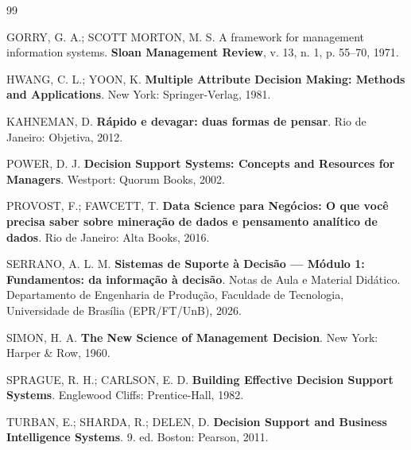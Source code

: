 \documentclass[12pt,a4paper]{article}
\begin{document}
\begin{thebibliography}{99}

GORRY, G. A.; SCOTT MORTON, M. S. A framework for management information systems. \textbf{Sloan Management Review}, v. 13, n. 1, p. 55--70, 1971.

HWANG, C. L.; YOON, K. \textbf{Multiple Attribute Decision Making: Methods and Applications}. New York: Springer-Verlag, 1981.

KAHNEMAN, D. \textbf{Rápido e devagar: duas formas de pensar}. Rio de Janeiro: Objetiva, 2012.

POWER, D. J. \textbf{Decision Support Systems: Concepts and Resources for Managers}. Westport: Quorum Books, 2002.

PROVOST, F.; FAWCETT, T. \textbf{Data Science para Negócios: O que você precisa saber sobre mineração de dados e pensamento analítico de dados}. Rio de Janeiro: Alta Books, 2016.

SERRANO, A. L. M. \textbf{Sistemas de Suporte à Decisão — Módulo 1: Fundamentos: da informação à decisão}. Notas de Aula e Material Didático. Departamento de Engenharia de Produção, Faculdade de Tecnologia, Universidade de Brasília (EPR/FT/UnB), 2026.

SIMON, H. A. \textbf{The New Science of Management Decision}. New York: Harper \& Row, 1960.

SPRAGUE, R. H.; CARLSON, E. D. \textbf{Building Effective Decision Support Systems}. Englewood Cliffs: Prentice-Hall, 1982.

TURBAN, E.; SHARDA, R.; DELEN, D. \textbf{Decision Support and Business Intelligence Systems}. 9. ed. Boston: Pearson, 2011.

\end{thebibliography}
\end{document}
